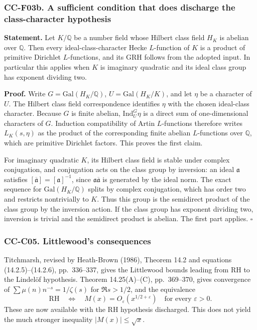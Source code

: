 \documentclass[11pt,a4paper]{article}
\theoremstyle{definition}\newtheorem{definition}[theorem]{Definition}
\theoremstyle{remark}\newtheorem{remark}[theorem]{Remark}
\begin{document}
\subsubsection{CC-F03b. A sufficient condition that does discharge the
class-character
hypothesis}\label{cc-f03b.-a-sufficient-condition-that-does-discharge-the-class-character-hypothesis}

\textbf{Statement.} Let \(K/\mathbb Q\) be a number field whose Hilbert
class field \(H_K\) is abelian over \(\mathbb Q\). Then every
ideal-class-character Hecke \(L\)-function of \(K\) is a product of
primitive Dirichlet \(L\)-functions, and its GRH follows from the
adopted input. In particular this applies when \(K\) is imaginary
quadratic and its ideal class group has exponent dividing two.

\textbf{Proof.} Write \(G=\mathrm{Gal}(H_K/\mathbb Q)\),
\(U=\mathrm{Gal}(H_K/K)\), and let \(\eta\) be a character of \(U\). The
Hilbert class field correspondence identifies \(\eta\) with the chosen
ideal-class character. Because \(G\) is finite abelian,
\(\mathrm{Ind}_U^G\eta\) is a direct sum of one-dimensional characters
of \(G\). Induction compatibility of Artin \(L\)-functions therefore
writes \(L_K(s,\eta)\) as the product of the corresponding finite
abelian \(L\)-functions over \(\mathbb Q\), which are primitive
Dirichlet factors. This proves the first claim.

For imaginary quadratic \(K\), its Hilbert class field is stable under
complex conjugation, and conjugation acts on the class group by
inversion: an ideal \(\mathfrak a\) satisfies
\([\overline{\mathfrak a}]=[\mathfrak a]^{-1}\), since
\(\mathfrak a\overline{\mathfrak a}\) is generated by the ideal norm.
The exact sequence for \(\mathrm{Gal}(H_K/\mathbb Q)\) splits by complex
conjugation, which has order two and restricts nontrivially to \(K\).
Thus this group is the semidirect product of the class group by the
inversion action. If the class group has exponent dividing two,
inversion is trivial and the semidirect product is abelian. The first
part applies. \(\square\)

\subsubsection{CC-C05. Littlewood's
consequences}\label{cc-c05.-littlewoods-consequences}

Titchmarsh, revised by Heath-Brown (1986), Theorem 14.2 and equations
(14.2.5)--(14.2.6), pp.~336--337, gives the Littlewood bounds leading
from RH to the Lindelöf hypothesis. Theorem 14.25(A)--(C), pp.~369--370,
gives convergence of \(\sum\mu(n)n^{-s}=1/\zeta(s)\) for \(\Re s>1/2\),
and the equivalence \[
 \mathrm{RH}\quad\Longleftrightarrow\quad
 M(x)=O_\varepsilon(x^{1/2+\varepsilon})
 \quad\text{for every }\varepsilon>0.
\] These are now available with the RH hypothesis discharged. This does
not yield the much stronger inequality \(|M(x)|\le\sqrt{x}\).
\end{document}
